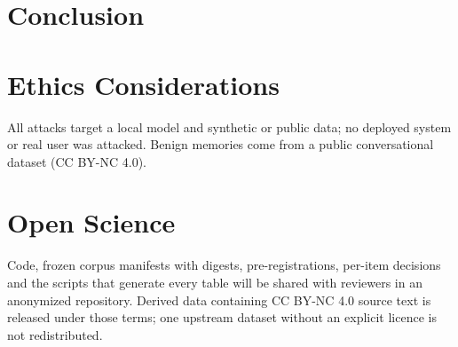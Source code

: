 \documentclass[conference,compsoc]{IEEEtran}
\begin{document}
\section{Conclusion}
\Conclusion{}

\section*{Ethics Considerations}
All attacks target a local model and synthetic or public data; no deployed system or real user was attacked. Benign memories come from a public conversational dataset (CC BY-NC 4.0).

\section*{Open Science}
Code, frozen corpus manifests with digests, pre-registrations, per-item decisions and the scripts that generate every table will be shared with reviewers in an anonymized repository. Derived data containing CC BY-NC 4.0 source text is released under those terms; one upstream dataset without an explicit licence is not redistributed.



\end{document}
